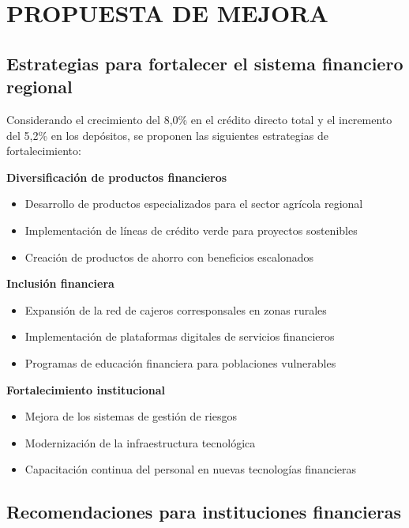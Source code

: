 \documentclass[12pt, a4paper]{article}
\begin{document}
\section{PROPUESTA DE MEJORA}

\subsection{Estrategias para fortalecer el sistema financiero regional}

Considerando el crecimiento del 8,0\% en el crédito directo total y el incremento del 5,2\% en los depósitos, se proponen las siguientes estrategias de fortalecimiento:

\textbf{Diversificación de productos financieros}

\begin{itemize}
    \item Desarrollo de productos especializados para el sector agrícola regional
    \item Implementación de líneas de crédito verde para proyectos sostenibles
    \item Creación de productos de ahorro con beneficios escalonados
\end{itemize}

\textbf{Inclusión financiera}

\begin{itemize}
    \item Expansión de la red de cajeros corresponsales en zonas rurales
    \item Implementación de plataformas digitales de servicios financieros
    \item Programas de educación financiera para poblaciones vulnerables
\end{itemize}

\textbf{Fortalecimiento institucional}

\begin{itemize}
    \item Mejora de los sistemas de gestión de riesgos
    \item Modernización de la infraestructura tecnológica
    \item Capacitación continua del personal en nuevas tecnologías financieras
\end{itemize}

\subsection{Recomendaciones para instituciones financieras}
\end{document}
